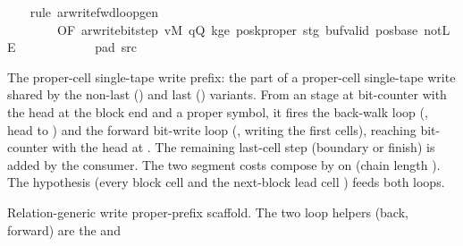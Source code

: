\begin{isabellebody}
%
\isadelimproof
\ \ %
\endisadelimproof
%
\isatagproof
{}\isamarkupfalse%
\ {\isacharparenleft}{\kern0pt}rule\ ar{\isacharunderscore}{\kern0pt}write{\isacharunderscore}{\kern0pt}fwd{\isacharunderscore}{\kern0pt}loop{\isacharunderscore}{\kern0pt}gen\isanewline
\ \ \ \ \ \ \ \ {\isacharbrackleft}{\kern0pt}OF\ ar{\isacharunderscore}{\kern0pt}write{\isacharunderscore}{\kern0pt}bit{\isacharunderscore}{\kern0pt}step\ vM\ qQ\ kge{}\ poskproper\ stg\ buf{\isacharunderscore}{\kern0pt}valid\ pos{\isacharunderscore}{\kern0pt}base\ notLE\isanewline
\ \ \ \ \ \ \ \ \ \ \ \ pad{}\ src{}{\isacharbrackright}{\kern0pt}{\isacharparenright}{\kern0pt}%
\endisatagproof
{\isafoldproof}%
%
\isadelimproof
%
\endisadelimproof
%
\begin{isamarkuptext}%
The proper-cell single-tape write prefix: the part of a
  proper-cell single-tape write shared by the non-last
  () and last () variants.  From an
   stage at bit-counter  with the head at
  the block end  and  a proper symbol,
  it fires the back-walk loop (, head to
  ) and the forward bit-write loop
  (, writing the first 
  cells), reaching bit-counter  with the head at
  .  The remaining last-cell step (boundary or
  finish) is added by the consumer.  The two segment costs compose by
   on  (chain length ).  The  hypothesis (every block cell and the
  next-block lead cell ) feeds both loops.%
\end{isamarkuptext}\isamarkuptrue%
%
\begin{isamarkuptext}%
Relation-generic write proper-prefix scaffold.  The two
  loop helpers (back, forward) are the  and

\end{isamarkuptext}
\end{isabellebody}
